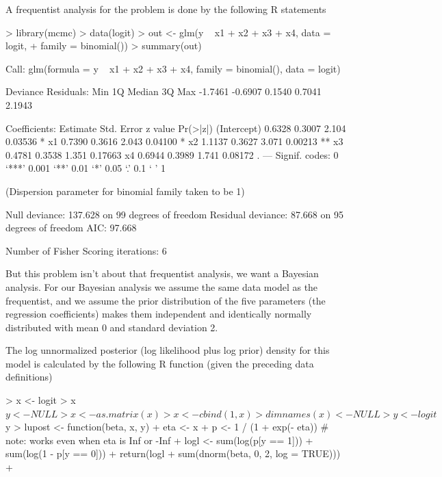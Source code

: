 \documentclass[12pt]{article}
\begin{document}
A frequentist analysis for the problem is done by the following R statements
\begin{Schunk}
\begin{Sinput}
> library(mcmc)
> data(logit)
> out <- glm(y ~ x1 + x2 + x3 + x4, data = logit,
+            family = binomial())
> summary(out)
\end{Sinput}
\begin{Soutput}
Call:
glm(formula = y ~ x1 + x2 + x3 + x4, family = binomial(), data = logit)

Deviance Residuals: 
    Min       1Q   Median       3Q      Max  
-1.7461  -0.6907   0.1540   0.7041   2.1943  

Coefficients:
            Estimate Std. Error z value Pr(>|z|)   
(Intercept)   0.6328     0.3007   2.104  0.03536 * 
x1            0.7390     0.3616   2.043  0.04100 * 
x2            1.1137     0.3627   3.071  0.00213 **
x3            0.4781     0.3538   1.351  0.17663   
x4            0.6944     0.3989   1.741  0.08172 . 
---
Signif. codes:  0 ‘***’ 0.001 ‘**’ 0.01 ‘*’ 0.05 ‘.’ 0.1 ‘ ’ 1 

(Dispersion parameter for binomial family taken to be 1)

    Null deviance: 137.628  on 99  degrees of freedom
Residual deviance:  87.668  on 95  degrees of freedom
AIC: 97.668

Number of Fisher Scoring iterations: 6
\end{Soutput}
\end{Schunk}

But this problem isn't about that frequentist analysis, we want a Bayesian
analysis.  For our Bayesian analysis we assume the same data model as the
frequentist, and we assume the prior distribution of the five parameters
(the regression coefficients) makes them independent and identically
normally distributed with mean 0 and standard deviation 2.

The log unnormalized posterior (log likelihood plus log prior) density
for this model is calculated by
the following R function (given the preceding data definitions)
\begin{Schunk}
\begin{Sinput}
> x <- logit
> x$y <- NULL
> x <- as.matrix(x)
> x <- cbind(1, x)
> dimnames(x) <- NULL
> y <- logit$y
> lupost <- function(beta, x, y) {
+     eta <- x %
+     p <- 1 / (1 + exp(- eta))   # note: works even when eta is Inf or -Inf
+     logl <- sum(log(p[y == 1])) + sum(log(1 - p[y == 0]))
+     return(logl + sum(dnorm(beta, 0, 2, log = TRUE)))
+ }
\end{Sinput}
\end{Schunk}
\end{document}
